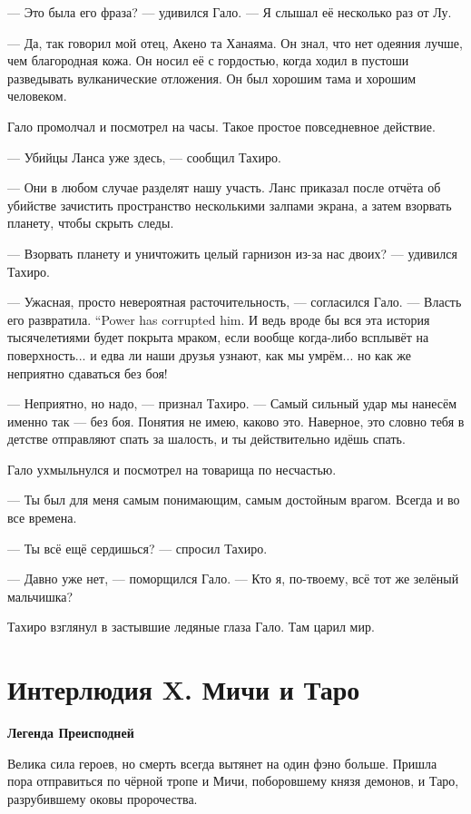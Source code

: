 --- Это была его фраза? --- удивился Гало.
--- Я слышал её несколько раз от Лу.

--- Да, так говорил мой отец, Акено та Ханаяма.
Он знал, что нет одеяния лучше, чем благородная кожа.
Он носил её с гордостью, когда ходил в пустоши разведывать вулканические отложения.
Он был хорошим тама и хорошим человеком.

Гало промолчал и посмотрел на часы.
Такое простое повседневное действие.

--- Убийцы Ланса уже здесь, --- сообщил Тахиро.

--- Они в любом случае разделят нашу участь.
Ланс приказал после отчёта об убийстве зачистить пространство несколькими залпами экрана, а затем взорвать планету, чтобы скрыть следы.

--- Взорвать планету и уничтожить целый гарнизон из-за нас двоих? --- удивился Тахиро.

--- Ужасная, просто невероятная расточительность, --- согласился Гало.
{--- Власть его развратила.}
{``Power has corrupted him.}
И ведь вроде бы вся эта история тысячелетиями будет покрыта мраком, если вообще когда-либо всплывёт на поверхность... и едва ли наши друзья узнают, как мы умрём... но как же неприятно сдаваться без боя!

--- Неприятно, но надо, --- признал Тахиро.
--- Самый сильный удар мы нанесём именно так --- без боя.
Понятия не имею, каково это.
Наверное, это словно тебя в детстве отправляют спать за шалость, и ты действительно идёшь спать.

Гало ухмыльнулся и посмотрел на товарища по несчастью.

--- Ты был для меня самым понимающим, самым достойным врагом.
Всегда и во все времена.

--- Ты всё ещё сердишься? --- спросил Тахиро.

--- Давно уже нет, --- поморщился Гало.
--- Кто я, по-твоему, всё тот же зелёный мальчишка?

Тахиро взглянул в застывшие ледяные глаза Гало.
Там царил мир.

\chapter*{Интерлюдия X. Мичи и Таро}

\textbf{Легенда Преисподней}

Велика сила героев, но смерть всегда вытянет на один фэно\FM{} больше.
Пришла пора отправиться по чёрной тропе и Мичи, поборовшему князя демонов, и Таро, разрубившему оковы пророчества.

